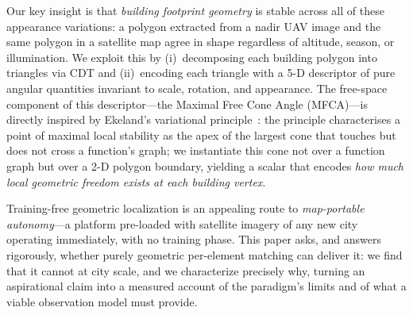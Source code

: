 \documentclass[10pt]{article}
\theoremstyle{plain}
\theoremstyle{definition}
\begin{document}
Our key insight is that \emph{building footprint geometry} is stable across
all of these appearance variations: a polygon extracted from a nadir UAV image
and the same polygon in a satellite map agree in shape regardless of altitude,
season, or illumination.
We exploit this by (i)~decomposing each building polygon into triangles via CDT
and (ii)~encoding each triangle with a 5-D descriptor of pure angular
quantities invariant to scale, rotation, and appearance.
The free-space component of this descriptor---the Maximal Free Cone Angle
(MFCA)---is directly inspired by Ekeland's variational principle~\cite{ekeland1974}:
the principle characterises a point of maximal local stability as the apex
of the largest cone that touches but does not cross a function's graph;
we instantiate this cone not over a function graph but over a 2-D polygon
boundary, yielding a scalar that encodes \emph{how much local geometric
freedom exists at each building vertex}.

Training-free geometric localization is an appealing route to
\emph{map-portable autonomy}---a platform pre-loaded with satellite imagery of
any new city operating immediately, with no training phase.
This paper asks, and answers rigorously, whether purely geometric per-element
matching can deliver it: we find that it cannot at city scale, and we
characterize precisely why, turning an aspirational claim into a measured
account of the paradigm's limits and of what a viable observation model must
provide.
\end{document}
